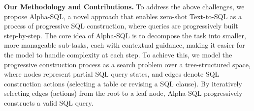 


\textbf{Our Methodology and Contributions.}
To address the above challenges, we propose Alpha-SQL, a novel approach that enables zero-shot Text-to-SQL as a process of progressive SQL construction, where queries are progressively built step-by-step. The core idea of Alpha-SQL is to decompose the task into smaller, more manageable sub-tasks, each with contextual guidance, making it easier for the model to handle complexity at each step. To achieve this, we model the progressive construction process as a search problem over a tree-structured space, where nodes represent partial SQL query states, and edges denote SQL construction actions (\eg selecting a table or revising a SQL clause). By iteratively selecting edges (actions) from the root to a leaf node, Alpha-SQL progressively constructs a valid SQL query.

